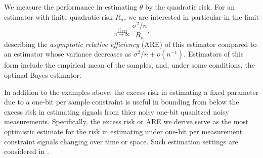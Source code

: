 \documentclass[letterpaper, 11pt]{IEEEtran}      %
\begin{document}
%
We measure the performance in estimating $\theta$ by the quadratic risk. For an estimator with finite quadratic risk $R_n$, we are interested in particular in the limit
\begin{equation}
\label{eq:ARE_def}
\lim_{n\to \infty} \frac{\sigma^2/n}{R_n},
\end{equation}
describing the \emph{asymptotic relative efficiency} (ARE) of this estimator compared to an estimator whose variance decreases as $\sigma^2/n+o(n^{-1})$. Estimators of this form include the empirical mean of the samples, and, under some conditions, the optimal Bayes estimator. \par
%
In addition to the examples above, the excess risk in estimating a fixed parameter due to a one-bit per sample constraint is useful in bounding from below the excess risk in estimating signals from thier noisy one-bit quanitzed noisy measurements. Specifically, the excess risk or ARE we derive serve as the most optimistic estimate for the risk in estimating under one-bit per measurement constraint signals changing over time or space. Such estimation settings are considered in \cite{baraniuk2017exponential, jacques2013robust, plan2013one, li2017channel, choi2016near}. \par

\end{document}
